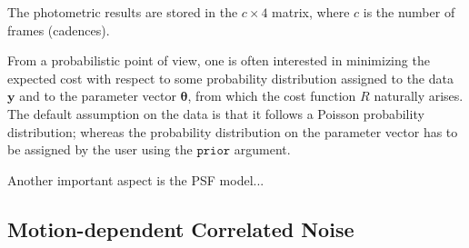\documentclass{article}
\begin{document}
The photometric results are stored in the $c \times 4$ matrix, where $c$ is the
number of frames (cadences).

From a probabilistic point of view, one is often interested in minimizing the
expected cost with respect to some probability distribution assigned to the data
$\bm{y}$ and to the parameter vector $\bm{\theta}$, from which the cost function
$R$ naturally arises. The default assumption on the data is that it follows
a Poisson probability distribution; whereas the probability distribution on the
parameter vector has to be assigned by the user using the $\texttt{prior}$
argument.

Another important aspect is the PSF model...

\subsection{Motion-dependent Correlated Noise}
\label{subsection:motion}
\end{document}
